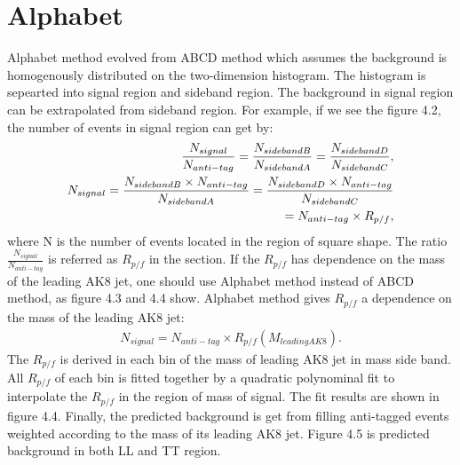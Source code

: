 \section{Alphabet}
Alphabet method evolved from ABCD method which assumes the background is homogenously distributed on the two-dimension histogram. The histogram is sepearted into signal region and sideband region. The background in signal region can be extrapolated from sideband region. For example, if we see the figure 4.2, the number of events in signal region can get by:
\begin{equation} \label{eq1}
\centering
\begin{split}
\frac{N_{signal}}{N_{anti-tag}} = \frac{N_{side band B}}{N_{side band A}} = \frac{N_{side band D}}{N_{side band C}}, \\
N_{signal} = \frac{N_{side band B} \times N_{anti-tag}}{N_{side band A}} = \frac{N_{side band D} \times N_{anti-tag}}{N_{side band C}} \\
= N_{anti-tag} \times R_{p/f}, \\
\end{split}
\end{equation}
where N is the number of events located in the region of square shape. The ratio $\frac{N_{signal}}{N_{anti-tag}}$ is referred as $R_{p/f}$ in the section. If the $R_{p/f}$ has dependence on the mass of the leading AK8 jet, one should use Alphabet method instead of ABCD method, as figure 4.3 and 4.4 show. Alphabet method gives $R_{p/f}$ a dependence on the mass of the leading AK8 jet:
\begin{equation} \label{eq2}
\begin{split}
N_{signal} = N_{anti-tag} \times R_{p/f} (M_{leading AK8}).
\end{split}
\end{equation}
The $R_{p/f}$ is derived in each bin of the mass of leading AK8 jet in mass side band. All $R_{p/f}$ of each bin is fitted together by a quadratic polynominal fit to interpolate the $R_{p/f}$ in the region of mass of signal. The fit results are shown in figure 4.4. Finally, the predicted background is get from filling anti-tagged events weighted according to the mass of its leading AK8 jet. Figure 4.5 is predicted background in both LL and TT region. 

